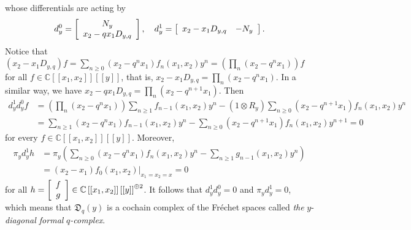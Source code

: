 \documentclass[12pt,reqno]{amsart}%
\theoremstyle{plain}
\numberwithin{theorem}{section} \numberwithin{equation}{section}
\numberwithin{lemma}{section}
\numberwithin{remark}{section}
\numberwithin{example}{section}
\numberwithin{proposition}{section}
\numberwithin{definition}{section}
\numberwithin{corollary}{section}
\begin{document}
whose differentials are acting by%
\begin{equation}
d_{y}^{0}=\left[
\begin{array}
[c]{c}%
N_{y}\\
x_{2}-qx_{1}D_{y,q}%
\end{array}
\right]  ,\quad d_{y}^{1}=\left[
\begin{array}
[c]{cc}%
x_{2}-x_{1}D_{y,q} & -N_{y}%
\end{array}
\right]  . \label{Fdif}%
\end{equation}
Notice that $\left(  x_{2}-x_{1}D_{y,q}\right)  f=\sum_{n\geq0}\left(
x_{2}-q^{n}x_{1}\right)  f_{n}\left(  x_{1},x_{2}\right)  y^{n}=\left(
\prod\limits_{n}\left(  x_{2}-q^{n}x_{1}\right)  \right)  f$ for all
$f\in\mathbb{C}\left[  \left[  x_{1},x_{2}\right]  \right]  \left[  \left[
y\right]  \right]  $, that is, $x_{2}-x_{1}D_{y,q}=\prod\limits_{n}\left(
x_{2}-q^{n}x_{1}\right)  $. In a similar way, we have $x_{2}-qx_{1}%
D_{y,q}=\prod\limits_{n}\left(  x_{2}-q^{n+1}x_{1}\right)  $. Then
\begin{align*}
d_{y}^{1}d_{y}^{0}f  &  =\left(  \prod\limits_{n}\left(  x_{2}-q^{n}%
x_{1}\right)  \right)  \sum_{n\geq1}f_{n-1}\left(  x_{1},x_{2}\right)
y^{n}-\left(  1\otimes R_{y}\right)  \sum_{n\geq0}\left(  x_{2}-q^{n+1}%
x_{1}\right)  f_{n}\left(  x_{1},x_{2}\right)  y^{n}\\
&  =\sum_{n\geq1}\left(  x_{2}-q^{n}x_{1}\right)  f_{n-1}\left(  x_{1}%
,x_{2}\right)  y^{n}-\sum_{n\geq0}\left(  x_{2}-q^{n+1}x_{1}\right)
f_{n}\left(  x_{1},x_{2}\right)  y^{n+1}=0
\end{align*}
for every $f\in\mathbb{C}\left[  \left[  x_{1},x_{2}\right]  \right]  \left[
\left[  y\right]  \right]  $. Moreover,
\begin{align*}
\pi_{y}d_{y}^{1}h  &  =\pi_{y}\left(  \sum_{n\geq0}\left(  x_{2}-q^{n}%
x_{1}\right)  f_{n}\left(  x_{1},x_{2}\right)  y^{n}-\sum_{n\geq1}%
g_{n-1}\left(  x_{1},x_{2}\right)  y^{n}\right) \\
&  =\left(  x_{2}-x_{1}\right)  f_{0}\left(  x_{1},x_{2}\right)
|_{x_{1}=x_{2}=x}=0
\end{align*}
for all $h=\left[
\begin{array}
[c]{c}%
f\\
g
\end{array}
\right]  \in\mathbb{C}\left[  \left[  x_{1},x_{2}\right]  \right]  \left[
\left[  y\right]  \right]  ^{\oplus2}$. It follows that $d_{y}^{1}d_{y}^{0}=0$
and $\pi_{y}d_{y}^{1}=0$, which means that $\mathfrak{D}_{q}\left(  y\right)
$ is a cochain complex of the Fr\'{e}chet spaces called \textit{the }%
$y$-\textit{diagonal formal }$q$\textit{-complex}.
\end{document}

